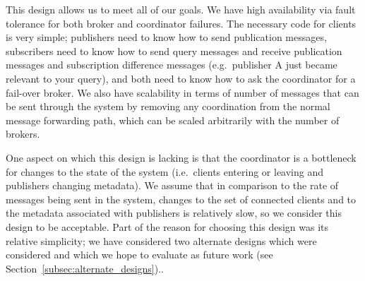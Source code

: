 This design allows us to meet all of our goals.
We have high availability via fault tolerance for both broker and coordinator failures.
The necessary code for clients is very simple; publishers need to know how to send publication messages, subscribers need to know how to send query messages and receive publication messages and subscription difference messages (e.g.\ publisher A just became relevant to your query), and both need to know how to ask the coordinator for a fail-over broker.
We also have scalability in terms of number of messages that can be sent through the system by removing any coordination from the normal message forwarding path, which can be scaled arbitrarily with the number of brokers.

One aspect on which this design is lacking is that the coordinator is a bottleneck for changes to the state of the system (i.e.\ clients entering or leaving and publishers changing metadata).
We assume that in comparison to the rate of messages being sent in the system, changes to the set of connected clients and to the metadata associated with publishers is relatively slow, so we consider this design to be acceptable.
Part of the reason for choosing this design was its relative simplicity; we have considered two alternate designs which were considered and which we hope to evaluate as future work (see Section~\ref{subsec:alternate_designs})..


